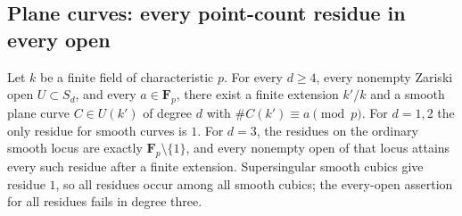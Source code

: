\subsection{Plane curves: every point-count residue in every open}
\label{subsec:plane-residues}

\begin{theorem}\label{thm:plane-all-residues}
Let $k$ be a finite field of characteristic $p$.  For every $d\geq4$,
every nonempty Zariski open $U\subset S_d$, and every $a\in\mathbf F_p$,
there exist a finite extension $k'/k$ and a smooth plane curve
$C\in U(k')$ of degree $d$ with $\#C(k')\equiv a\pmod p$.
For $d=1,2$ the only residue for smooth curves is $1$.
For $d=3$, the residues on the ordinary smooth locus are exactly
$\mathbf F_p\setminus\{1\}$, and every nonempty open of that locus
attains every such residue after a finite extension.  Supersingular
smooth cubics give residue $1$, so all residues occur among all smooth
cubics; the every-open assertion for all residues fails in degree three.
\end{theorem}
